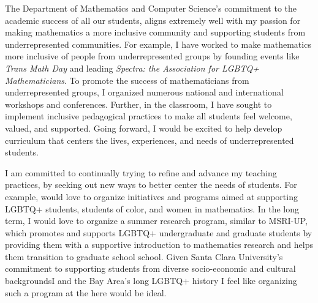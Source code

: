 \documentclass[11pt]{article}
\begin{document}
The Department of Mathematics and Computer Science's commitment to the academic success of all our students, aligns extremely well with my passion for making mathematics a more inclusive community and supporting students from underrepresented communities. For example, I have worked to make mathematics more inclusive of people from underrepresented groups by founding events like \textit{Trans Math Day} and leading \textit{Spectra: the Association for LGBTQ+ Mathematicians}. To promote the success of mathematicians from underrepresented groups, I organized numerous national and international workshops and conferences. Further, in the classroom, I have sought to implement inclusive pedagogical practices to make all students feel welcome, valued, and supported. Going forward, I would be excited to help develop curriculum that centers the lives, experiences, and needs of underrepresented students. 

I am committed to continually trying to refine and advance my teaching practices, by seeking out new ways to better center the needs of students. For example, would love to organize initiatives and programs aimed at supporting LGBTQ+ students, students of color, and women in mathematics. In the long term, I would love to organize a summer research program, similar to MSRI-UP, which promotes and supports LGBTQ+ undergraduate and graduate students by providing them with a supportive introduction to mathematics research and helps them transition to graduate school school. Given Santa Clara University's commitment to supporting students from diverse socio-economic and cultural backgroundsI and the Bay Area's long LGBTQ+ history I feel like organizing such a program at the here would be ideal. 
\end{document}
